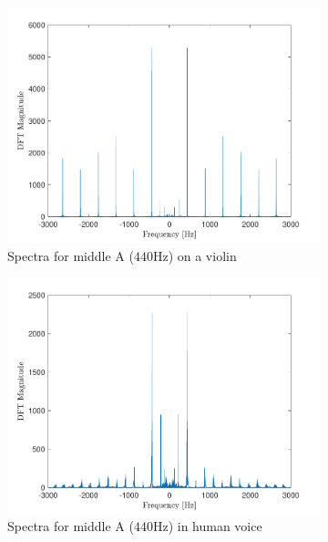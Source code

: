 \documentclass[10pt]{article}
\begin{document}
\begin{figure}[ht]
    \centering
    \begin{subfigure}[b]{0.48\textwidth}
        \includegraphics[width=\textwidth]{problem7_a440_violin_spectra.pdf}
        \caption{Spectra for middle A ($440$Hz) on a violin}
    \end{subfigure}
    \quad
    \begin{subfigure}[b]{0.48\textwidth}
        \includegraphics[width=\textwidth]{problem7_a440_voice_spectra.pdf}
        \caption{Spectra for middle A ($440$Hz) in human voice}
    \end{subfigure}
    \quad
    \begin{subfigure}[b]{0.48\textwidth}

\end{subfigure}
\end{figure}
\end{document}
